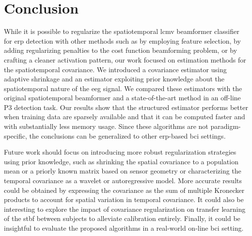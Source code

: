 	\section{Conclusion}
	While it is possible to regularize the spatiotemporal \ac{lcmv} beamformer
	classifier for \ac{erp} detection with other methods such as by employing feature selection,
	by adding regularizing penalties to the cost
	function beamforming problem, or by crafting a cleaner activation pattern, our work focused on
	estimation methods for the spatiotemporal covariance.
	We introduced a covariance estimator using adaptive shrinkage and an
	estimator exploiting prior knowledge about the spatiotemporal nature of the \ac{eeg}
	signal.
	We compared these estimators with the original spatiotemporal
	beamformer and a state-of-the-art method in an off-line P3 detection task.
	Our results show that the structured estimator performs better when training
  data are sparsely available and that it can be computed faster and with
  substantially less memory usage.
	Since these algorithms are not paradigm-specific,  the conclusions can be generalized to
	other \ac{erp}-based \ac{bci} settings.

	Future work should focus on introducing more robust regularization strategies using prior knowledge, such as shrinking the spatial covariance to a population mean or a priorly known matrix based on sensor geometry or characterizing the temporal covariance as a wavelet or autoregressive model.
	More accurate results could be obtained by expressing the covariance as the sum of multiple Kronecker products to account for spatial variation in temporal
	covariance.
	It could also be interesting to explore the impact of covariance regularization on transfer learning of the \ac{stbf} between subjects to alleviate calibration entirely.
	Finally, it could be insightful to evaluate the proposed algorithms in a
	real-world on-line \ac{bci} setting.




